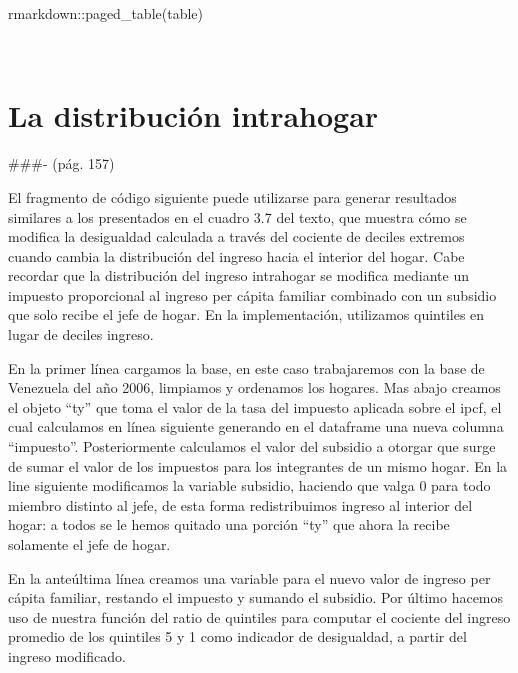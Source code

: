 \documentclass[
]{book}
\newenvironment{Shaded}{\begin{snugshade}}{\end{snugshade}}
\newcommand{\FunctionTok}[1]{\textcolor[rgb]{0.00,0.00,0.00}{#1}}
\newcommand{\NormalTok}[1]{#1}
\newcommand{\SpecialCharTok}[1]{\textcolor[rgb]{0.00,0.00,0.00}{#1}}
\begin{document}
\begin{Shaded}
\begin{Highlighting}[]
\NormalTok{rmarkdown}\SpecialCharTok{::}\FunctionTok{paged\_table}\NormalTok{(table)}
\end{Highlighting}
\end{Shaded}

~

\hypertarget{la-distribuciuxf3n-intrahogar}{%
\section{La distribución intrahogar}\label{la-distribuciuxf3n-intrahogar}}

\#\#\#- (pág. 157)

El fragmento de código siguiente puede utilizarse para generar resultados similares a los presentados en el cuadro 3.7 del texto, que muestra cómo se modifica la desigualdad calculada a través del cociente de deciles extremos cuando cambia la distribución del ingreso hacia el interior del hogar. Cabe recordar que la distribución del ingreso intrahogar se modifica mediante un impuesto proporcional al ingreso per cápita familiar combinado con un subsidio que solo recibe el jefe de hogar. En la implementación, utilizamos quintiles en lugar de deciles ingreso.

En la primer línea cargamos la base, en este caso trabajaremos con la base de Venezuela del año 2006, limpiamos y ordenamos los hogares. Mas abajo creamos el objeto ``ty'' que toma el valor de la tasa del impuesto aplicada sobre el ipcf, el cual calculamos en línea siguiente generando en el dataframe una nueva columna ``impuesto''. Posteriormente calculamos el valor del subsidio a otorgar que surge de sumar el valor de los impuestos para los integrantes de un mismo hogar. En la line siguiente modificamos la variable subsidio, haciendo que valga 0 para todo miembro distinto al jefe, de esta forma redistribuimos ingreso al interior del hogar: a todos se le hemos quitado una porción ``ty'' que ahora la recibe solamente el jefe de hogar.

En la anteúltima línea creamos una variable para el nuevo valor de ingreso per cápita familiar, restando el impuesto y sumando el subsidio. Por último hacemos uso de nuestra función del ratio de quintiles para computar el cociente del ingreso promedio de los quintiles 5 y 1 como indicador de desigualdad, a partir del ingreso modificado.
\end{document}
